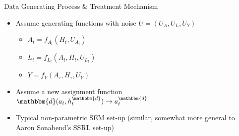 \documentclass{beamer}
\newcommand{\widesubitem}[2]{\begin{itemize} \item #1 \end{itemize} \vspace{#2}}
\newcommand{\assign}{\mathbbm{d}}
\begin{document}
\begin{frame}{{Data Generating Process \& Treatment Mechanism}}

    \begin{itemize}\setlength\itemsep{1em}
        \item Assume generating functions with noise $U = (U_A, U_L, U_Y)$

            \widesubitem{$A_t = f_{A_t}(H_t,  U_{A_t})$}{0.5em}
            \widesubitem{$L_t = f_{L_t}(A_t, H_t,  U_{L_t})$}{0.5em}
            \widesubitem{$Y = f_Y(A_{\tau}, H_\tau,  U_Y)$}{0.5em}

        \item Assume a new assignment function $\assign(a_t, h_t^\assign) \rightarrow a^\assign_t $

        \item Typical non-parametric SEM set-up (similar, somewhat more general to Aaron Sonabend's SSRL set-up)
    \end{itemize}
\end{frame}
\end{document}
